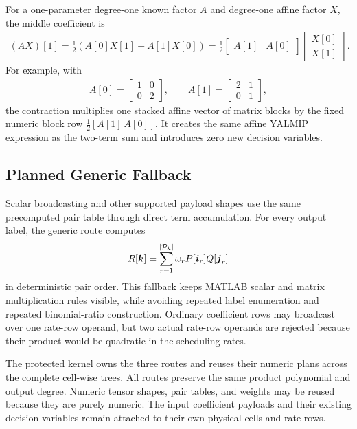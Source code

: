 For a one-parameter degree-one known factor $A$ and degree-one affine factor $X$, the middle coefficient is
\begin{gather*}
(AX)[1]=\frac12\left(A[0]X[1]+A[1]X[0]\right)
=\frac12
\begin{bmatrix}A[1]&A[0]\end{bmatrix}
\begin{bmatrix}X[0]\\X[1]\end{bmatrix}.
\end{gather*}
For example, with
\begin{gather*}
A[0]=\begin{bmatrix}1&0\\0&2\end{bmatrix},
\qquad
A[1]=\begin{bmatrix}2&1\\0&1\end{bmatrix},
\end{gather*}
the contraction multiplies one stacked affine vector of matrix blocks by the fixed numeric block row $\tfrac12[A[1]\ A[0]]$. It creates the same affine YALMIP expression as the two-term sum and introduces zero new decision variables.

\subsection{Planned Generic Fallback}

Scalar broadcasting and other supported payload shapes use the same precomputed pair table through direct term accumulation. For every output label, the generic route computes
\begin{gather*}
R[\boldsymbol{k}]=\sum_{r=1}^{|\mathcal P_{\boldsymbol{k}}|}\omega_r P[\boldsymbol{i}_r]Q[\boldsymbol{j}_r]
\end{gather*}
in deterministic pair order. This fallback keeps MATLAB scalar and matrix multiplication rules visible, while avoiding repeated label enumeration and repeated binomial-ratio construction. Ordinary coefficient rows may broadcast over one rate-row operand, but two actual rate-row operands are rejected because their product would be quadratic in the scheduling rates.

The protected  kernel owns the three routes and reuses their numeric plans across the complete cell-wise trees. All routes preserve the same product polynomial and output degree. Numeric tensor shapes, pair tables, and weights may be reused because they are purely numeric. The input coefficient payloads and their existing decision variables remain attached to their own physical cells and rate rows.

